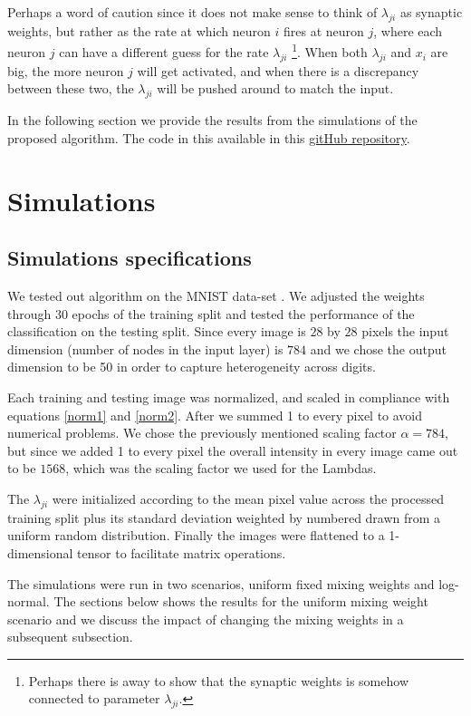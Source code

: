 \documentclass{article}
\begin{document}
Perhaps a word of caution since it does not make
sense to think of $\lambda_{ji}$ as synaptic weights, but rather as the rate at which neuron $i$ fires at neuron $j$,
where each neuron $j$ can have a different guess for the rate $\lambda_{ji}$ \footnote{Perhaps there is away to show that the synaptic weights is somehow connected to parameter \(\lambda_{ji}\).}. 
When both $\lambda_{ji}$ and $x_i$ are big, the more neuron $j$ will get activated, and when there is a discrepancy between these two, the $\lambda_{ji}$ will be pushed around to match the input.

In the following section we provide the results from the simulations of the proposed algorithm. The code in this available in this \href{https://github.com/Sann5/neural_populations}{\color{draculacyan} gitHub repository}. 

\section{Simulations}
\subsection{Simulations specifications}
We tested out algorithm on the MNIST data-set \cite{deng2012mnist}. We adjusted the weights through 30 epochs of the training split and tested the performance of the classification on the testing split. Since every image is $28$ by $28$ pixels the input dimension (number of nodes in the input layer) is $784$ and we chose the output dimension to be 50 in order to capture heterogeneity across digits. 

Each training and testing image was normalized, and scaled in compliance with equations \eqref{norm1} and \eqref{norm2}. After we summed 1 to every pixel to avoid numerical problems. We chose the previously mentioned scaling factor $\alpha = 784$, but since we added 1 to every pixel the overall intensity in every image came out to be $1568$, which was the scaling factor we used for the Lambdas.  

The \(\lambda_{ji}\) were initialized according to the mean pixel value across the processed training split plus its standard deviation weighted by numbered drawn from a uniform random distribution. Finally the images were flattened to a 1-dimensional tensor to facilitate matrix operations. 

The simulations were run in two scenarios, uniform fixed mixing weights and log-normal. The sections below shows the results for the uniform mixing weight scenario and we discuss the impact of changing the mixing weights in a subsequent subsection. 
\end{document}
